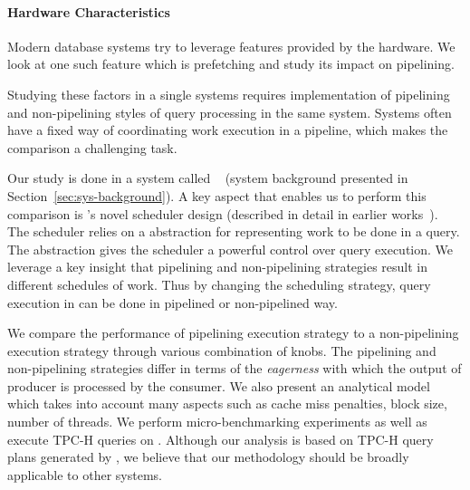 \paragraph*{\textbf{Hardware Characteristics}}
Modern database systems try to leverage features provided by the hardware.
We look at one such feature which is prefetching and study its impact on pipelining.

Studying these factors in a single systems requires implementation of pipelining and non-pipelining styles of query processing in the same system.
Systems often have a fixed way of coordinating work execution in a pipeline, which makes the comparison a challenging task. 

Our study is done in a system called \sys{}~\cite{quickstep-system} (system background presented in Section~\ref{sec:sys-background}).
A key aspect that enables us to perform this comparison is \sys{}'s novel scheduler design (described in detail in earlier works~\cite{quickstep-system, DBLP:conf/bigdata/DeshmukhMP17}).
The scheduler relies on a \wo{} abstraction for representing work to be done in a query.
The \wo{} abstraction gives the \sys{} scheduler a powerful control over query execution.
We leverage a key insight that pipelining and non-pipelining strategies result in different schedules of work.
Thus by changing the scheduling strategy, query execution in \sys{} can be done in pipelined or non-pipelined way. 

We compare the performance of pipelining execution strategy to a non-pipelining execution strategy through various combination of knobs. 
The pipelining and non-pipelining strategies differ in terms of the \textit{eagerness} with which the output of producer is processed by the consumer.
We also present an analytical model which takes into account many aspects such as cache miss penalties, block size, number of threads.
We perform micro-benchmarking experiments as well as execute TPC-H queries on \sys{}. 
Although our analysis is based on TPC-H query plans generated by \sys{}, we believe that our methodology should be broadly applicable to other systems.

